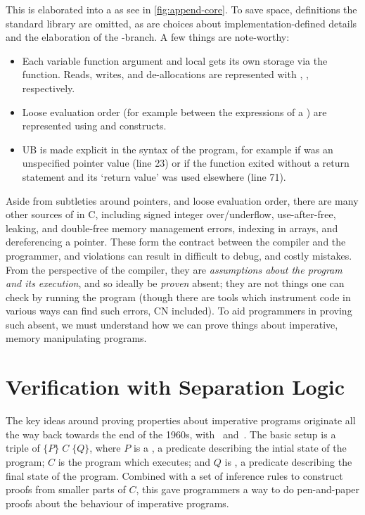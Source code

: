 This is elaborated into a  as see in \cref{fig:append-core}. To save
space, definitions the  standard library are omitted, as are choices
about implementation-defined details and the elaboration of the -branch.
A few things are note-worthy:
\begin{itemize}
    \item Each variable function argument and local gets its own storage via the
         function. Reads, writes, and de-allocations are
        represented with , ,
         respectively.
    \item Loose evaluation order (for example between the expressions of a \cinline{==}) 
        are represented using  and  constructs.
    \item UB is made explicit in the syntax of the program, for example if  was
        an unspecified pointer value (line 23) or if the function exited without a return statement
        and its `return value' was used elsewhere (line 71).
\end{itemize}

Aside from subtleties around pointers, and loose evaluation order, there are
many other sources of  in C, including signed integer over/underflow,
use-after-free, leaking, and double-free memory management errors,
 indexing in arrays, and dereferencing a 
pointer. These form the contract between the compiler and the programmer, and
violations can result in difficult to debug, and costly mistakes. From the
perspective of the compiler, they are \emph{assumptions about the program and
its execution}, and so ideally be \emph{proven} absent; they are not things one
can check by running the program (though there are tools which instrument code
in various ways can find such errors, CN included). To aid programmers in
proving such  absent, we must understand how we can prove things about
imperative, memory manipulating programs.

\section{Verification with Separation Logic}

The key ideas around proving properties about imperative programs originate all
the way back towards the end of the 1960s, with~\citeauthor{floyd1993assigning}
and~\citeauthor{hoare1969axiomatic}. The basic setup is a triple of
$\{P\} \;C \; \{Q\}$, where $P$ is a , a predicate describing the
intial state of the program; $C$ is the program which executes; and $Q$ is
, a predicate describing the final state of the program.
Combined with a set of inference rules to construct proofs from smaller parts
of $C$, this gave programmers a way to do pen-and-paper proofs about the
behaviour of imperative programs.

